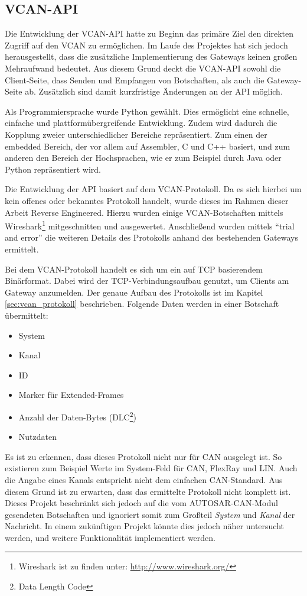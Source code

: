 \documentclass[
  a4paper,					    %
  twoside,
  DIV=calc,     				%
  bibliography=totoc,
  cleardoublepage=empty,
  ngerman,     					%
  final       					%
]{scrbook}
\begin{document}
\subsection{VCAN-API}
\label{sec:VCAN_API}
Die Entwicklung der VCAN-API hatte zu Beginn das primäre Ziel den direkten Zugriff auf den VCAN zu ermöglichen. Im Laufe des Projektes hat sich jedoch herausgestellt, dass die zusätzliche Implementierung des Gateways keinen großen Mehraufwand bedeutet. Aus diesem Grund deckt die VCAN-API sowohl die Client-Seite, dass Senden und Empfangen von Botschaften, als auch die Gateway-Seite ab. Zusätzlich sind damit kurzfristige Änderungen an der API möglich.

Als Programmiersprache wurde Python gewählt. Dies ermöglicht eine schnelle, einfache und plattformübergreifende Entwicklung. Zudem wird dadurch die Kopplung zweier unterschiedlicher Bereiche repräsentiert. Zum einen der embedded Bereich, der vor allem auf Assembler, C und C++ basiert, und zum anderen den Bereich der Hochsprachen, wie er zum Beispiel durch Java oder Python repräsentiert wird.

Die Entwicklung der API basiert auf dem VCAN-Protokoll. Da es sich hierbei um kein offenes oder bekanntes Protokoll handelt, wurde dieses im Rahmen dieser Arbeit Reverse Engineered. Hierzu wurden einige VCAN-Botschaften mittels Wireshark\footnote{Wireshark ist zu finden unter: \url{http://www.wireshark.org/}} mitgeschnitten und ausgewertet. Anschließend wurden mittels "`trial and error"' die weiteren Details des Protokolls anhand des bestehenden Gateways ermittelt.

Bei dem VCAN-Protokoll handelt es sich um ein auf TCP basierendem Binärformat. Dabei wird der TCP-Verbindungsaufbau genutzt, um Clients am Gateway anzumelden. Der genaue Aufbau des Protokolls ist im Kapitel \ref{sec:vcan_protokoll} beschrieben. Folgende Daten werden in einer Botschaft übermittelt:

\begin{itemize}
    \item System
    \item Kanal
    \item ID
    \item Marker für Extended-Frames
    \item Anzahl der Daten-Bytes (DLC\footnote{Data Length Code})
    \item Nutzdaten
\end{itemize}

Es ist zu erkennen, dass dieses Protokoll nicht nur für CAN ausgelegt ist. So existieren zum Beispiel Werte im System-Feld für CAN, FlexRay und LIN. Auch die Angabe eines Kanals entspricht nicht dem einfachen CAN-Standard. Aus diesem Grund ist zu erwarten, dass das ermittelte Protokoll nicht komplett ist. Dieses Projekt beschränkt sich jedoch auf die vom AUTOSAR-CAN-Modul gesendeten Botschaften und ignoriert somit zum Großteil \emph{System} und \emph{Kanal} der Nachricht. In einem zukünftigen Projekt könnte dies jedoch näher untersucht werden, und weitere Funktionalität implementiert werden.
\end{document}
